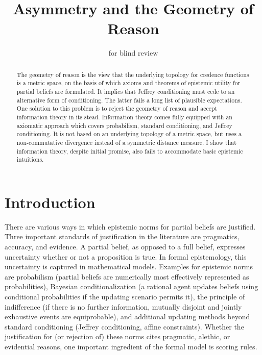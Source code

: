 \documentclass[12pt]{article}
\begin{document}


\title{Asymmetry and the Geometry of Reason}
\author{for blind review}
\date{}
\maketitle

\maketitle

\begin{abstract}
  {\noindent}The geometry of reason is the view that the underlying
  topology for credence functions is a metric space, on the basis of
  which axioms and theorems of epistemic utility for partial beliefs
  are formulated. It implies that Jeffrey conditioning must cede to an
  alternative form of conditioning. The latter fails a long list of
  plausible expectations. One solution to this problem is to reject
  the geometry of reason and accept information theory in its stead.
  Information theory comes fully equipped with an axiomatic approach
  which covers probabilism, standard conditioning, and Jeffrey
  conditioning. It is not based on an underlying topology of a metric
  space, but uses a non-commutative divergence instead of a symmetric
  distance measure. I show that information theory, despite initial
  promise, also fails to accommodate basic epistemic intuitions.
\end{abstract}

\section{Introduction}
\label{intr}

There are various ways in which epistemic norms for partial
beliefs are justified. Three important standards of justification in
the literature are pragmatics, accuracy, and evidence. A partial
belief, as opposed to a full belief, expresses uncertainty whether or
not a proposition is true. In formal epistemology, this uncertainty is
captured in mathematical models. Examples for epistemic norms are
probabilism (partial beliefs are numerically most effectively
represented as probabilities), Bayesian conditionalization (a rational
agent updates beliefs using conditional probabilities if the updating
scenario permits it), the principle of indifference (if there is no
further information, mutually disjoint and jointly exhaustive events
are equiprobable), and additional updating methods beyond standard
conditioning (Jeffrey conditioning, affine constraints). Whether the
justification for (or rejection of) these norms cites pragmatic,
alethic, or evidential reasons, one important ingredient of the formal
model is scoring rules.
\end{document}
